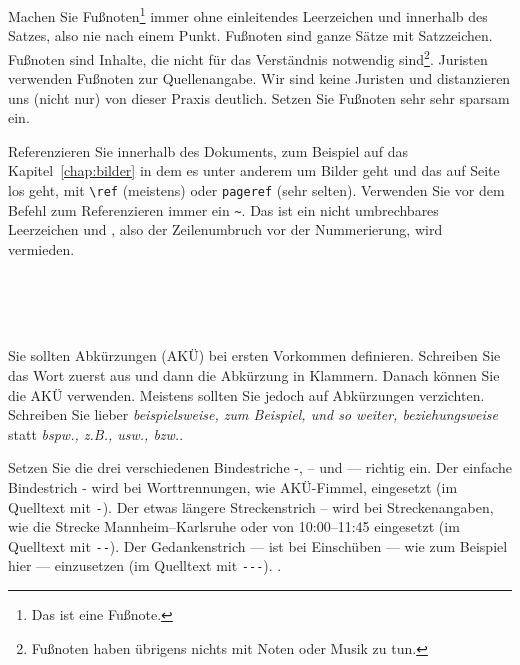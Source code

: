 \documentclass[11pt,a4paper]{report}
\begin{document}
Machen Sie Fußnoten\footnote{Das ist eine Fußnote.} immer
ohne einleitendes Leerzeichen und innerhalb des Satzes,
also nie nach einem Punkt. 
Fußnoten sind ganze Sätze mit Satzzeichen.
Fußnoten sind Inhalte, die nicht für das Verständnis 
notwendig sind\footnote{Fußnoten haben übrigens 
nichts mit Noten oder Musik zu tun.}. 
Juristen verwenden Fußnoten zur Quellenangabe. Wir
sind keine Juristen und distanzieren uns 
(nicht nur) von dieser Praxis deutlich.
Setzen Sie Fußnoten sehr sehr sparsam ein.

Referenzieren Sie innerhalb des Dokuments, zum Beispiel
auf das Kapitel~\ref{chap:bilder} in dem es unter anderem
um Bilder geht und das auf Seite~\pageref{chap:bilder}
los geht, mit \verb|\ref| (meistens) oder 
\verb|pageref| (sehr selten). 
Verwenden Sie vor dem Befehl zum Referenzieren immer
ein \verb|~|. Das ist ein nicht umbrechbares Leerzeichen
und , also der 
Zeilenumbruch vor der Nummerierung, wird vermieden.

\newline
{}\\ 
\\
\\

Sie sollten Abkürzungen (AKÜ) bei ersten Vorkommen definieren.
Schreiben Sie das Wort zuerst aus und dann die Abkürzung in 
Klammern. 
Danach können Sie die AKÜ verwenden. 
Meistens sollten Sie jedoch auf Abkürzungen verzichten.
Schreiben Sie lieber
\textit{beispielsweise, zum Beispiel, und so weiter, beziehungsweise}
statt \textit{bspw., z.B., usw., bzw.}.

Setzen Sie die drei verschiedenen Bindestriche -, -- und --- richtig
ein. 
Der einfache Bindestrich - wird bei Worttrennungen, 
wie AKÜ-Fimmel, eingesetzt (im Quelltext mit \verb|-|).
Der etwas längere Streckenstrich -- wird bei Streckenangaben, wie
die Strecke Mannheim--Karlsruhe oder von 10:00--11:45 eingesetzt
(im Quelltext mit \verb|--|).
Der Gedankenstrich --- ist bei Einschüben --- wie zum Beispiel
hier --- einzusetzen (im Quelltext mit \verb|---|).
.
\end{document}
